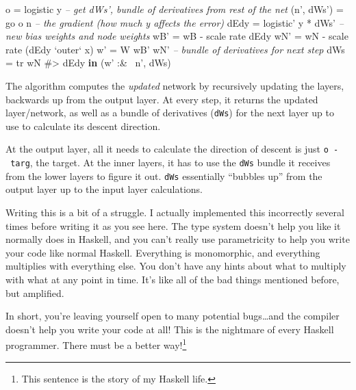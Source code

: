 \documentclass[]{article}
\newenvironment{Shaded}{}{}
\newcommand{\KeywordTok}[1]{\textcolor[rgb]{0.00,0.44,0.13}{\textbf{{#1}}}}
\newcommand{\DataTypeTok}[1]{\textcolor[rgb]{0.56,0.13,0.00}{{#1}}}
\newcommand{\CommentTok}[1]{\textcolor[rgb]{0.38,0.63,0.69}{\textit{{#1}}}}
\newcommand{\OtherTok}[1]{\textcolor[rgb]{0.00,0.44,0.13}{{#1}}}
\newcommand{\FunctionTok}[1]{\textcolor[rgb]{0.02,0.16,0.49}{{#1}}}
\newcommand{\NormalTok}[1]{{#1}}
\begin{document}
\begin{Shaded}
\begin{Highlighting}[]
              \NormalTok{o          }\FunctionTok{=} \NormalTok{logistic y}
              \CommentTok{-- get dWs', bundle of derivatives from rest of the net}
              \NormalTok{(n', dWs') }\FunctionTok{=} \NormalTok{go o n}
              \CommentTok{-- the gradient (how much y affects the error)}
              \NormalTok{dEdy       }\FunctionTok{=} \NormalTok{logistic' y }\FunctionTok{*} \NormalTok{dWs'}
              \CommentTok{-- new bias weights and node weights}
              \NormalTok{wB'  }\FunctionTok{=} \NormalTok{wB }\FunctionTok{-} \NormalTok{scale rate dEdy}
              \NormalTok{wN'  }\FunctionTok{=} \NormalTok{wN }\FunctionTok{-} \NormalTok{scale rate (dEdy }\OtherTok{`outer`} \NormalTok{x)}
              \NormalTok{w'   }\FunctionTok{=} \DataTypeTok{W} \NormalTok{wB' wN'}
              \CommentTok{-- bundle of derivatives for next step}
              \NormalTok{dWs  }\FunctionTok{=} \NormalTok{tr wN }\FunctionTok{#>} \NormalTok{dEdy}
          \KeywordTok{in}  \NormalTok{(w' }\FunctionTok{:&~} \NormalTok{n', dWs)}
\end{Highlighting}
\end{Shaded}

The algorithm computes the \emph{updated} network by recursively updating the
layers, backwards up from the output layer. At every step, it returns the
updated layer/network, as well as a bundle of derivatives (\texttt{dWs}) for the
next layer up to use to calculate its descent direction.

At the output layer, all it needs to calculate the direction of descent is just
\texttt{o\ -\ targ}, the target. At the inner layers, it has to use the
\texttt{dWs} bundle it receives from the lower layers to figure it out.
\texttt{dWs} essentially ``bubbles up'' from the output layer up to the input
layer calculations.

Writing this is a bit of a struggle. I actually implemented this incorrectly
several times before writing it as you see here. The type system doesn't help
you like it normally does in Haskell, and you can't really use parametricity to
help you write your code like normal Haskell. Everything is monomorphic, and
everything multiplies with everything else. You don't have any hints about what
to multiply with what at any point in time. It's like all of the bad things
mentioned before, but amplified.

In short, you're leaving yourself open to many potential bugs\ldots{}and the
compiler doesn't help you write your code at all! This is the nightmare of every
Haskell programmer. There must be a better way!\footnote{This sentence is the
  story of my Haskell life.}
\end{document}
